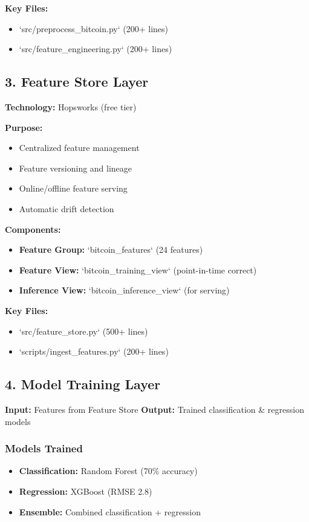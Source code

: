 \textbf{Key Files:}
\begin{itemize}
    \item `src/preprocess\_bitcoin.py` (200+ lines)
    \item `src/feature\_engineering.py` (200+ lines)
\end{itemize}

\subsection{3. Feature Store Layer}

\textbf{Technology:} Hopsworks (free tier)

\textbf{Purpose:}
\begin{itemize}
    \item Centralized feature management
    \item Feature versioning and lineage
    \item Online/offline feature serving
    \item Automatic drift detection
\end{itemize}

\textbf{Components:}
\begin{itemize}
    \item \textbf{Feature Group:} `bitcoin\_features` (24 features)
    \item \textbf{Feature View:} `bitcoin\_training\_view` (point-in-time correct)
    \item \textbf{Inference View:} `bitcoin\_inference\_view` (for serving)
\end{itemize}

\textbf{Key Files:}
\begin{itemize}
    \item `src/feature\_store.py` (500+ lines)
    \item `scripts/ingest\_features.py` (200+ lines)
\end{itemize}

\subsection{4. Model Training Layer}

\textbf{Input:} Features from Feature Store  
\textbf{Output:} Trained classification \& regression models

\subsubsection{Models Trained}
\begin{itemize}
    \item \textbf{Classification:} Random Forest (70\% accuracy)
    \item \textbf{Regression:} XGBoost (RMSE 2.8)
    \item \textbf{Ensemble:} Combined classification + regression
\end{itemize}

